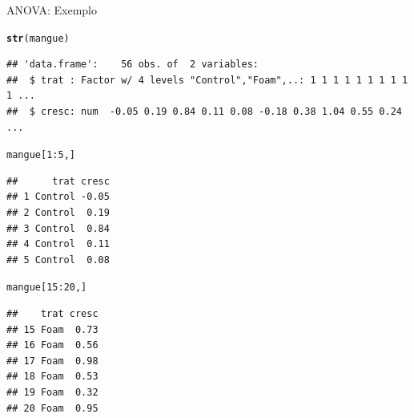 \documentclass{beamer}\usepackage[]{graphicx}\usepackage[]{color}
\makeatletter
\newcommand{\hlnum}[1]{\textcolor[rgb]{0.686,0.059,0.569}{#1}}%
\newcommand{\hlopt}[1]{\textcolor[rgb]{0,0,0}{#1}}%
\newcommand{\hlstd}[1]{\textcolor[rgb]{0.345,0.345,0.345}{#1}}%
\newcommand{\hlkwd}[1]{\textcolor[rgb]{0.737,0.353,0.396}{\textbf{#1}}}%
\newenvironment{kframe}{%
 \def\at@end@of@kframe{}%
 \ifinner\ifhmode%
  \def\at@end@of@kframe{\end{minipage}}%
  \begin{minipage}{\columnwidth}%
 \fi\fi%
 \def\FrameCommand##1{\hskip\@totalleftmargin \hskip-\fboxsep
 \colorbox{shadecolor}{##1}\hskip-\fboxsep
     \hskip-\linewidth \hskip-\@totalleftmargin \hskip\columnwidth}%
 \MakeFramed {\advance\hsize-\width
   \@totalleftmargin\z@ \linewidth\hsize
   \@setminipage}}%
 {\par\unskip\endMakeFramed%
 \at@end@of@kframe}
\newenvironment{knitrout}{}{} %
\renewenvironment{knitrout}{\setlength{\topsep}{0mm}}{}
\makeatother
\begin{document}
\begin{frame}[fragile]{ANOVA: Exemplo}

\begin{knitrout}\tiny
{}\color{fgcolor}\begin{kframe}
\begin{alltt}
\hlkwd{str}\hlstd{(mangue)}
\end{alltt}
\begin{verbatim}
## 'data.frame':	56 obs. of  2 variables:
##  $ trat : Factor w/ 4 levels "Control","Foam",..: 1 1 1 1 1 1 1 1 1 1 ...
##  $ cresc: num  -0.05 0.19 0.84 0.11 0.08 -0.18 0.38 1.04 0.55 0.24 ...
\end{verbatim}
\begin{alltt}
\hlstd{mangue[}\hlnum{1}\hlopt{:}\hlnum{5}\hlstd{,]}
\end{alltt}
\begin{verbatim}
##      trat cresc
## 1 Control -0.05
## 2 Control  0.19
## 3 Control  0.84
## 4 Control  0.11
## 5 Control  0.08
\end{verbatim}
\begin{alltt}
\hlstd{mangue[}\hlnum{15}\hlopt{:}\hlnum{20}\hlstd{,]}
\end{alltt}
\begin{verbatim}
##    trat cresc
## 15 Foam  0.73
## 16 Foam  0.56
## 17 Foam  0.98
## 18 Foam  0.53
## 19 Foam  0.32
## 20 Foam  0.95
\end{verbatim}
\end{kframe}
\end{knitrout}

\end{frame}
\end{document}
